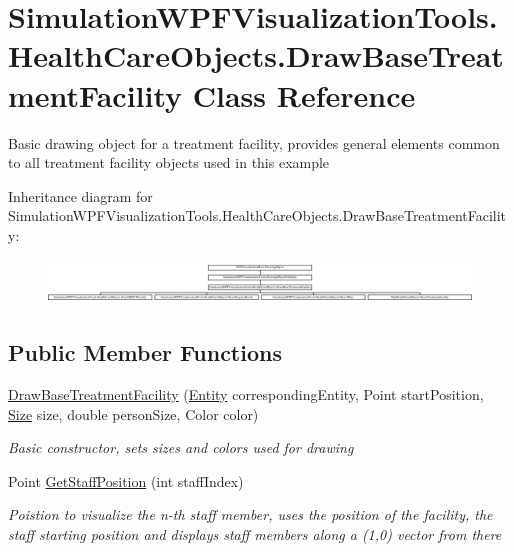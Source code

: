 \hypertarget{class_simulation_w_p_f_visualization_tools_1_1_health_care_objects_1_1_draw_base_treatment_facility}{}\section{Simulation\+W\+P\+F\+Visualization\+Tools.\+Health\+Care\+Objects.\+Draw\+Base\+Treatment\+Facility Class Reference}
\label{class_simulation_w_p_f_visualization_tools_1_1_health_care_objects_1_1_draw_base_treatment_facility}


Basic drawing object for a treatment facility, provides general elements common to all treatment facility objects used in this example  


Inheritance diagram for Simulation\+W\+P\+F\+Visualization\+Tools.\+Health\+Care\+Objects.\+Draw\+Base\+Treatment\+Facility\+:\begin{figure}[H]
\begin{center}
\leavevmode
\includegraphics[height=1.181435cm]{class_simulation_w_p_f_visualization_tools_1_1_health_care_objects_1_1_draw_base_treatment_facility}
\end{center}
\end{figure}
\subsection*{Public Member Functions}
\begin{DoxyCompactItemize}
\item 
\hyperlink{class_simulation_w_p_f_visualization_tools_1_1_health_care_objects_1_1_draw_base_treatment_facility_a174ae799d2ff9a96dbd35bfc067c0d62}{Draw\+Base\+Treatment\+Facility} (\hyperlink{class_simulation_core_1_1_h_c_c_m_elements_1_1_entity}{Entity} corresponding\+Entity, Point start\+Position, \hyperlink{class_simulation_w_p_f_visualization_tools_1_1_health_care_objects_1_1_draw_base_treatment_facility_a83f48a13fa5f4f714e22088818f2038a}{Size} size, double person\+Size, Color color)
\begin{DoxyCompactList}\small\item\em Basic constructor, sets sizes and colors used for drawing \end{DoxyCompactList}\item 
Point \hyperlink{class_simulation_w_p_f_visualization_tools_1_1_health_care_objects_1_1_draw_base_treatment_facility_a47d53b7db9542237e85ae6745aaef0e9}{Get\+Staff\+Position} (int staff\+Index)
\begin{DoxyCompactList}\small\item\em Poistion to visualize the n-\/th staff member, uses the position of the facility, the staff starting position and displays staff members along a (1,0) vector from there \end{DoxyCompactList}\end{DoxyCompactItemize}
